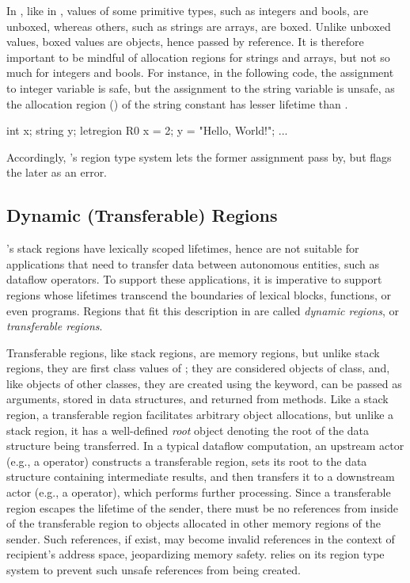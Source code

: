 In \name, like in \csharp, values of some primitive types, such as
integers and bools, are unboxed, whereas others, such as strings are
arrays, are boxed. Unlike unboxed values, boxed values are objects,
hence passed by reference. It is therefore important to be mindful
of allocation regions for strings and arrays, but not so much for
integers and bools. For instance, in the following code, the
assignment to integer variable  is safe, but the assignment to
the string variable  is unsafe, as the allocation region ()
of the string constant has lesser lifetime than .
\begin{center}
\begin{codejava}
  int x;
  string y;
  letregion R0 {
    x = 2;
    y = "Hello, World!";
  }
  ...
\end{codejava}
\end{center}
Accordingly, \name's region type system lets the former assignment
pass by, but flags the later as an error.

\subsection{Dynamic (Transferable) Regions}

\name's stack regions have lexically scoped lifetimes, hence are not
suitable for applications that need to transfer data between
autonomous entities, such as \naiad dataflow operators. To support
these applications, it is imperative to support regions whose
lifetimes transcend the boundaries of lexical blocks, functions, or
even programs. Regions that fit this description in \name are called
\emph{dynamic regions}, or \emph{transferable regions}. 

Transferable regions, like stack regions, are memory regions, but
unlike stack regions, they are first class values of \name; they are
considered objects of  class, and, like objects of other
classes, they are created using the  keyword, can be passed as
arguments, stored in data structures, and returned from methods. Like
a stack region, a transferable region facilitates arbitrary object
allocations, but unlike a stack region, it has a well-defined
\emph{root} object denoting the root of the data structure being
transferred. In a typical dataflow computation, an upstream actor
(e.g., a  operator) constructs a transferable region, sets
its root to the data structure containing intermediate results, and
then transfers it to a downstream actor (e.g., a  operator),
which performs further processing. Since a transferable region escapes
the lifetime of the sender, there must be no references from inside of
the transferable region to objects allocated in other memory regions
of the sender. Such references, if exist, may become invalid
references in the context of recipient's address space, jeopardizing
memory safety. \name relies on its region type system to prevent such
unsafe references from being created.

